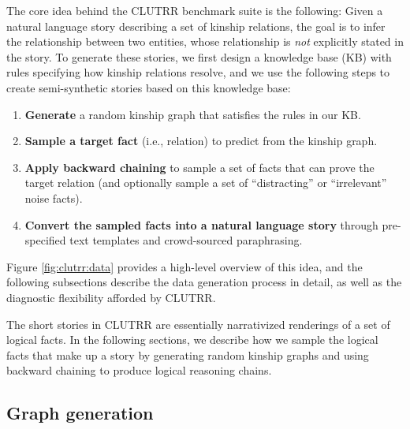 \documentclass[letterpaper, 12pt]{report}
\begin{document}
The core idea behind the CLUTRR benchmark suite is the following: Given a natural language story describing a set of kinship relations, the goal is to infer the relationship between two entities, whose relationship is {\em not} explicitly stated in the story.
To generate these stories, we first design a knowledge base (KB) with rules specifying how kinship relations resolve, and we use the following steps to create semi-synthetic stories based on this knowledge base:
\begin{enumerate}[topsep=3pt, parsep=6pt, leftmargin=40pt, itemsep=0pt, label={\bf Step \arabic*.}]
    \item \textbf{Generate} a random kinship graph that satisfies the rules in our KB.
    \item
        \textbf{Sample a target fact} (i.e., relation) to predict from the kinship graph.
    \item
        \textbf{Apply backward chaining} to sample a set of facts that can prove the target relation (and optionally sample a set of ``distracting'' or ``irrelevant'' noise facts).
    \item
        \textbf{Convert the sampled facts into a natural language story} through pre-specified text templates and crowd-sourced paraphrasing.
\end{enumerate}

Figure \ref{fig:clutrr:data} provides a high-level overview of this idea, and the following subsections describe the data generation process in detail, as well as the diagnostic flexibility afforded by CLUTRR.



The short stories in CLUTRR are essentially narrativized renderings of a set of logical facts.
In the following sections, we describe how we sample the logical facts that make up a story by generating random kinship graphs and using backward chaining to produce logical reasoning chains.


\subsection{Graph generation}
\end{document}
